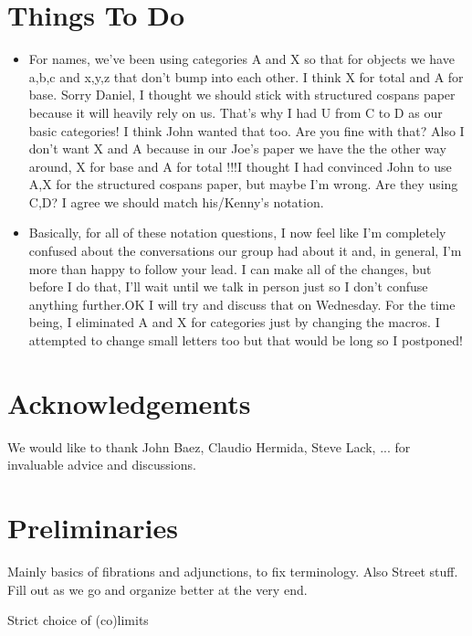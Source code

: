 \documentclass{amsart}
\begin{document}
\section*{Things To Do}
\begin{itemize}
\item {\daniel For names, we've been using categories A and
    X so that for objects we have a,b,c and x,y,z that don't
    bump into each other.  I think X for total and A for
    base. }{\chris Sorry Daniel, I thought we should stick
    with structured cospans paper because it will heavily
    rely on us. That's why I had U from C to D as our basic
    categories! I think John wanted that too. Are you fine
    with that? Also I don't want X and A because in our
    Joe's paper we have the the other way around, X for base
    and A for total !!!}{\daniel I thought I had convinced
    John to use A,X for the structured cospans paper, but
    maybe I'm wrong. Are they using C,D?  I agree we should
    match his/Kenny's notation.} 
     
\item {\daniel Basically, for all of these notation questions, I
    now feel like I'm completely confused about the
    conversations our group had about it and, in general,
    I'm more than happy to follow your lead. I can make all
    of the changes, but before I do that, I'll wait until we
  talk in person just so I don't confuse anything further.}{\chris OK I will try and discuss that on Wednesday. For the time being, I eliminated A and X for categories just by changing the macros. I attempted to change small letters too but that would be long so I postponed!}
\end{itemize}

\section*{Acknowledgements} We would like to thank John Baez, Claudio Hermida, Steve Lack, ... for invaluable advice and discussions.

\section{Preliminaries}\label{sec:preliminaries}

{\chris Mainly basics of fibrations and adjunctions, to fix terminology. Also Street stuff. Fill out as we go and organize better at the very end.
}

{\chris Strict choice of (co)limits}
\end{document}
